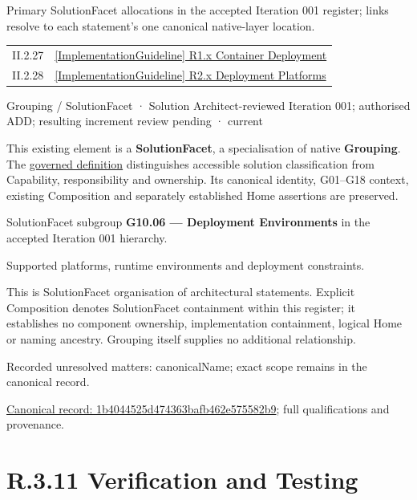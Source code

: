 Primary SolutionFacet allocations in the accepted Iteration 001 register; links resolve to each statement’s one canonical native-layer location.\par
\begin{longtable}{p{.22\linewidth}p{.73\linewidth}}
II.2.27 & \hyperref[element:536bbcae0de5495a8f4d2e994cdc2232]{[ImplementationGuideline] R1.x Container Deployment} \\
II.2.28 & \hyperref[element:e1521c49b740487e935fa9ecd00675a0]{[ImplementationGuideline] R2.x Deployment Platforms} \\
\end{longtable}
\label{element:1b4044525d474363bafb462e575582b9}
{\small Grouping / SolutionFacet · Solution Architect-reviewed Iteration 001; authorised ADD; resulting increment review pending · current}\par

This existing element is a \textbf{SolutionFacet}, a specialisation of native
\textbf{Grouping}. The \href{\detokenize{../../../../../../../governance/continuum-representation.md#solutionfacet-classification--1119-candidate}}{governed definition}
distinguishes accessible solution classification from Capability, responsibility
and ownership. Its canonical identity, G01–G18 context, existing Composition
and separately established Home assertions are preserved.



SolutionFacet subgroup \textbf{G10.06 — Deployment Environments} in the accepted Iteration 001 hierarchy.



Supported platforms, runtime environments and deployment constraints.



This is SolutionFacet organisation of architectural statements. Explicit Composition denotes SolutionFacet containment within this register; it establishes no component ownership, implementation containment, logical Home or naming ancestry. Grouping itself supplies no additional relationship.


{\small Recorded unresolved matters: canonicalName; exact scope remains in the canonical record.}\par
{\footnotesize \href{../../../../../../../continuum/grouping/1b4044525d474363bafb462e575582b9.md}{Canonical record: 1b4044525d474363bafb462e575582b9}; full qualifications and provenance.}\par
\section*{R.3.11 Verification and Testing}
\label{navigation:R.3.11}

